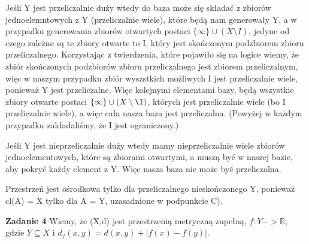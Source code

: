 \documentclass[12pt,a4paper]{article}
\def\R{\mathbb{R}}
\newcommand{\zadanie}[1]{\par\textbf{Zadanie #1}}
\begin{document}
    Jeśli Y jest przeliczalnie duży wtedy do baza może się składać z zbiorów jednoelemntowych z Y (przeliczalnie wiele), które będą nam generowały Y, a w przypadku generowania zbiorów otwartych postaci $\{\infty\} \cup (X\setminus I)$, jedyne od czego zależne są te zbiory otwarte to I, który jest skończonym podzbiorem zbioru przeliczalnego. Korzystając z twierdzenia, które pojawiło się na logice wiemy, że zbiór skończonych podzbiorów zbioru przeliczalnego jest zbiorem przeliczalnym, więc w naszym przypadku zbiór wyszstkich możliwych I jest przeliczalnie wiele, ponieważ Y jest przeliczalne. Więc kolejnymi elementami bazy, będą wszystkie zbiory otwarte postaci  $\{\infty\} \cup (X\setminus\I)$, których jest przeliczalnie wiele (bo I przeliczalnie wiele), a więc cała nasza baza jest przeliczalna.
    (Powyżej w każdym przypadku zakładaliśmy, że I jest ograniczony.)
    
    Jeśli Y jest nieprzeliczalnie duży wtedy mamy nieprzeliczalnie wiele zbiorów jednoelementowych, które są zbiorami otwartymi, a muszą być w naszej bazie, aby pokryć każdy element z Y. Więc nasza baza nie może być przeliczalna.
    
    Przestrzeń jest ośrodkowa tylko dla przeliczalnego nieskończonego Y, ponieważ cl(A) = X tylko dla A = Y, uzasadnione w podpunkcie C).
\zadanie{4}
Wiemy, że (X,d) jest przestrzenią metryczną zupełną, $f: Y -> \R$, gdzie $Y \subseteq X$ i $d_f(x,y) = d(x,y) + |f(x)-f(y)|$.
\end{document}
